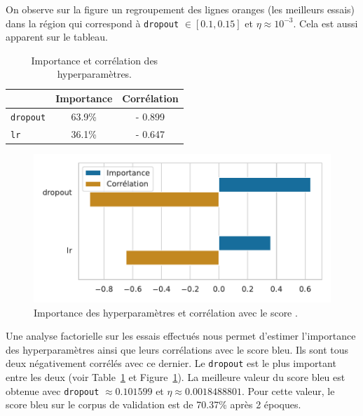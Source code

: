 On observe sur la figure un regroupement des lignes oranges (les meilleurs essais) 
dans la région qui correspond à \verb|dropout| \(\in[0.1, 0.15]\) et \(\eta\approx 10 ^{-3}\).
Cela est aussi apparent sur le tableau.
\begin{table}[hbt]
    \begin{center}
        \begin{tabular}{|l|c|c|}
            \cline{2-3}
            \multicolumn{1}{c|}{} & Importance & Corrélation \\
            \hline
            \verb|dropout|        & 63.9\%     & - 0.899     \\
            \hline
            \verb|lr|             & 36.1\%     & - 0.647     \\
            \hline
        \end{tabular}
    \end{center}
    \caption{Importance et corrélation des hyperparamètres.}
    \label{tab.results.hparam.corr}
\end{table}
\begin{figure}[hbt]
    \begin{center}
        \includegraphics[width=.7\textwidth]{assets/python/importance.pdf}
    \end{center}
    \caption{Importance des hyperparamètres et corrélation avec le score .}%
    \label{fig.results.hparam.corr}
\end{figure}
Une analyse factorielle sur les essais effectués nous permet d'estimer l'importance des hyperparamètres 
ainsi que leurs corrélations avec le score \gls{bleu}.
Ils sont tous deux négativement corrélés avec ce dernier.
Le \verb|dropout| est le plus important entre les deux 
(voir Table~\ref{tab.results.hparam.corr} et Figure~\ref{fig.results.hparam.corr}).
La meilleure valeur du score \gls{bleu} est obtenue 
avec \verb|dropout| \(\approx 0.101599\) et \(\eta\approx 0.0018488801\).
Pour cette valeur, le score \gls{bleu} sur le corpus de validation est de 70.37\% après 2 époques.